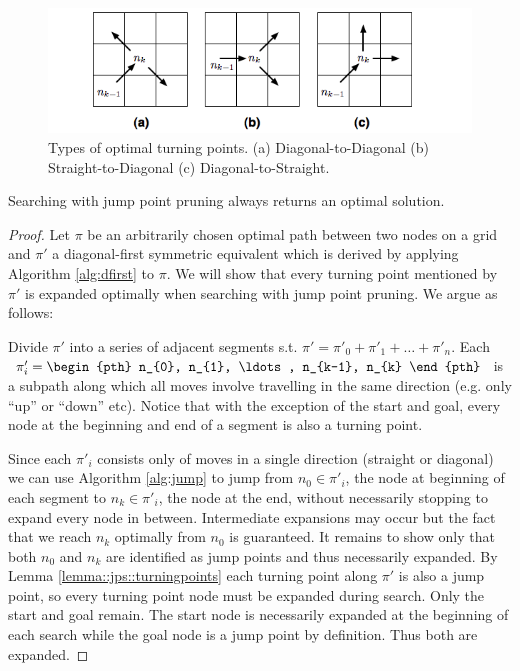 \begin{figure}[tb]
       \begin{center}
		   \includegraphics[width=0.95\columnwidth, trim = 10mm 10mm 10mm 0mm]
			{chapter_jps/diagrams/turningpoints.png}
       \end{center}
	\vspace{-3pt}
       \caption{Types of optimal turning points. (a) Diagonal-to-Diagonal
(b) Straight-to-Diagonal (c) Diagonal-to-Straight.}
       \label{fig:turningpoints}
\end{figure}

\begin{theorem}
\label{theorem::jps::jumping}
Searching with jump point pruning always returns an optimal solution. 
\end{theorem}
\begin{proof}
Let $\pi$ be an arbitrarily chosen optimal path between two nodes
on a grid and $\pi'$ a diagonal-first symmetric equivalent which is derived
by applying Algorithm \ref{alg:dfirst} to $\pi$.
We will show that every turning point mentioned by $\pi'$ is expanded optimally 
when searching with jump point pruning. We argue as follows:
\par
Divide $\pi'$ into a series of adjacent segments s.t. 
$\pi' = \pi'_{0} + \pi'_{1} + \ldots + \pi'_{n} $. Each $\pi'_{i} = \begin{pth} n_{0}, n_{1},
\ldots, n_{k-1}, n_{k} \end{pth}$ is a subpath along which all moves involve
travelling in the same direction (e.g.  only ``up'' or ``down'' etc).  Notice
that with the exception of the start and goal, every node at the beginning and
end of a segment is also a turning point.
\par
Since each $\pi'_{i}$ consists only of moves in a single direction
(straight or diagonal) we can use Algorithm \ref{alg:jump} to jump from $n_{0}
\in \pi'_{i}$, the node at beginning of each segment to $n_{k} \in \pi'_{i}$, the
node at the end, without necessarily stopping to expand every node in between.
Intermediate expansions may occur but the fact that we reach $n_{k}$
optimally from $n_{0}$ is guaranteed.
It remains to show only that both $n_{0}$ and $n_{k}$ are identified as
jump points and thus necessarily expanded. 
By Lemma \ref{lemma::jps::turningpoints} each turning point along $\pi'$ is 
also a jump point, so every turning point node must be expanded during search.
Only the start and goal remain. The start node is necessarily expanded at the
beginning of each search while the goal node is a jump point by definition.
Thus both are expanded.
\end{proof}
